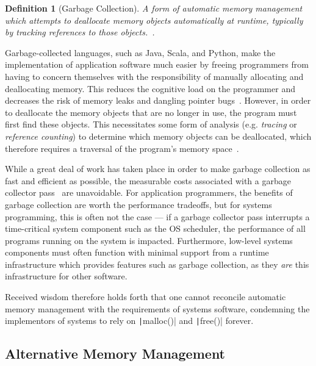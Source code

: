 \documentclass[11pt,a4paper]{article}
\theoremstyle{break}
\newtheorem{defn}{Definition}
\begin{document}
\begin{defn}[Garbage Collection]
A form of automatic memory management which attempts to deallocate memory objects automatically at runtime, typically by tracking references to those objects.~\cite{Bartley:2003:GC:1074100.1074419,Dijkstra:1978:OGC:359642.359655}.
\end{defn}

Garbage-collected languages, such as Java, Scala, and Python, make the implementation of application software much easier by freeing programmers from having to concern themselves with the responsibility of manually allocating and deallocating memory. This reduces the cognitive load on the programmer and decreases the risk of memory leaks and dangling pointer bugs~\cite{Hertz:2005:QPG:1094811.1094836,Dijkstra:1978:OGC:359642.359655}. However, in order to deallocate the memory objects that are no longer in use, the program must first find these objects. This necessitates some form of analysis (e.g. \textit{tracing} or \textit{reference counting}) to determine which memory objects can be deallocated, which therefore requires a traversal of the program's memory space~\cite{Hertz:2005:QPG:1094811.1094836,Dijkstra:1978:OGC:359642.359655,Bartley:2003:GC:1074100.1074419}.

While a great deal of work has taken place in order to make garbage collection as fast and efficient as possible, the measurable costs associated with a garbage collector pass~\cite{Hertz:2005:QPG:1094811.1094836} are unavoidable. For application programmers, the benefits of garbage collection are worth the performance tradeoffs, but for systems programming, this is often not the case --- if a garbage collector pass interrupts a time-critical system component such as the OS scheduler, the performance of all programs running on the system is impacted. Furthermore, low-level systems components must often function with minimal support from a runtime infrastructure which provides features such as garbage collection, as they \textit{are} this infrastructure for other software.

Received wisdom therefore holds forth that one cannot reconcile automatic memory management with the requirements of systems software, condemning the implementors of systems to rely on \texttt|malloc()| and \texttt|free()| forever.

\subsection{Alternative Memory Management}
\end{document}

